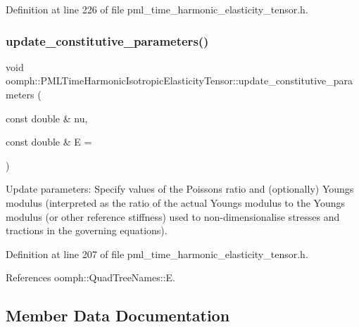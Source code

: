 Definition at line 226 of file pml\+\_\+time\+\_\+harmonic\+\_\+elasticity\+\_\+tensor.\+h.

\mbox{\label{classoomph_1_1PMLTimeHarmonicIsotropicElasticityTensor_a87798565f87daddd8b370ef4cb94f734}} 
\subsubsection{\texorpdfstring{update\+\_\+constitutive\+\_\+parameters()}{update\_constitutive\_parameters()}}
{\footnotesize\ttfamily void oomph\+::\+P\+M\+L\+Time\+Harmonic\+Isotropic\+Elasticity\+Tensor\+::update\+\_\+constitutive\+\_\+parameters (\begin{DoxyParamCaption}\item[{const double \&}]{nu,  }\item[{const double \&}]{E = {} }\end{DoxyParamCaption})\hspace{0.3cm}{\ttfamily [inline]}}



Update parameters\+: Specify values of the Poisson\textquotesingle{}s ratio and (optionally) Young\textquotesingle{}s modulus (interpreted as the ratio of the actual Young\textquotesingle{}s modulus to the Young\textquotesingle{}s modulus (or other reference stiffness) used to non-\/dimensionalise stresses and tractions in the governing equations). 



Definition at line 207 of file pml\+\_\+time\+\_\+harmonic\+\_\+elasticity\+\_\+tensor.\+h.



References oomph\+::\+Quad\+Tree\+Names\+::E.



\subsection{Member Data Documentation}
\mbox{\label{classoomph_1_1PMLTimeHarmonicIsotropicElasticityTensor_ab577ccf1c4b74e02a287461649b5198e}} 
